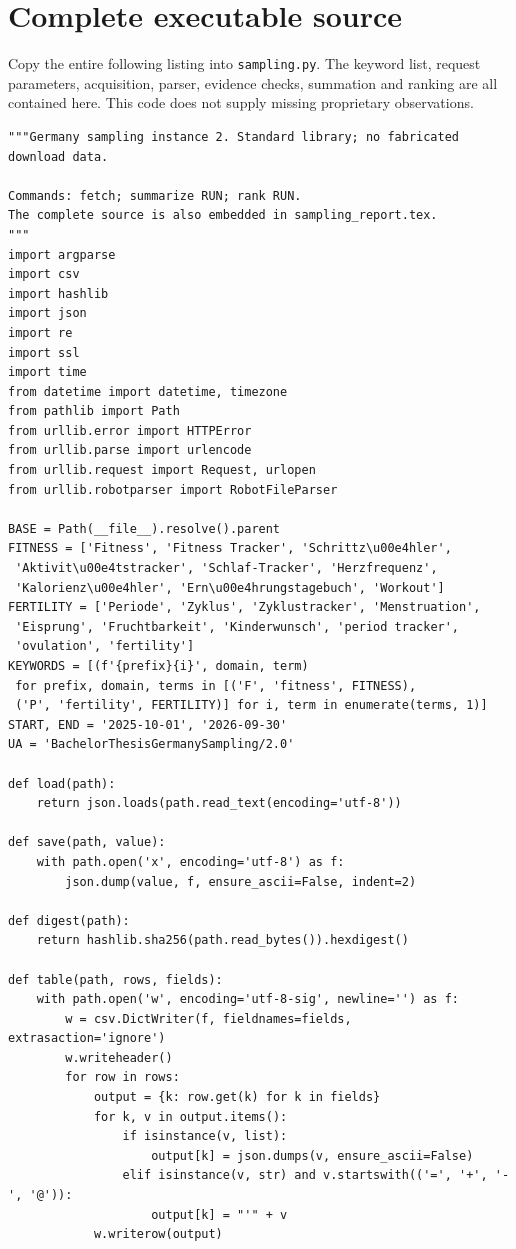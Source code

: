 \documentclass[10pt,a4paper]{article}
\begin{document}
\section{Complete executable source}
Copy the entire following listing into \texttt{sampling.py}. The keyword list,
request parameters, acquisition, parser, evidence checks, summation and ranking
are all contained here. This code does not supply missing proprietary observations.
\begin{lstlisting}
"""Germany sampling instance 2. Standard library; no fabricated download data.

Commands: fetch; summarize RUN; rank RUN.
The complete source is also embedded in sampling_report.tex.
"""
import argparse
import csv
import hashlib
import json
import re
import ssl
import time
from datetime import datetime, timezone
from pathlib import Path
from urllib.error import HTTPError
from urllib.parse import urlencode
from urllib.request import Request, urlopen
from urllib.robotparser import RobotFileParser

BASE = Path(__file__).resolve().parent
FITNESS = ['Fitness', 'Fitness Tracker', 'Schrittz\u00e4hler',
 'Aktivit\u00e4tstracker', 'Schlaf-Tracker', 'Herzfrequenz',
 'Kalorienz\u00e4hler', 'Ern\u00e4hrungstagebuch', 'Workout']
FERTILITY = ['Periode', 'Zyklus', 'Zyklustracker', 'Menstruation',
 'Eisprung', 'Fruchtbarkeit', 'Kinderwunsch', 'period tracker',
 'ovulation', 'fertility']
KEYWORDS = [(f'{prefix}{i}', domain, term)
 for prefix, domain, terms in [('F', 'fitness', FITNESS),
 ('P', 'fertility', FERTILITY)] for i, term in enumerate(terms, 1)]
START, END = '2025-10-01', '2026-09-30'
UA = 'BachelorThesisGermanySampling/2.0'

def load(path):
    return json.loads(path.read_text(encoding='utf-8'))

def save(path, value):
    with path.open('x', encoding='utf-8') as f:
        json.dump(value, f, ensure_ascii=False, indent=2)

def digest(path):
    return hashlib.sha256(path.read_bytes()).hexdigest()

def table(path, rows, fields):
    with path.open('w', encoding='utf-8-sig', newline='') as f:
        w = csv.DictWriter(f, fieldnames=fields, extrasaction='ignore')
        w.writeheader()
        for row in rows:
            output = {k: row.get(k) for k in fields}
            for k, v in output.items():
                if isinstance(v, list):
                    output[k] = json.dumps(v, ensure_ascii=False)
                elif isinstance(v, str) and v.startswith(('=', '+', '-', '@')):
                    output[k] = "'" + v
            w.writerow(output)


\end{lstlisting}
\end{document}
